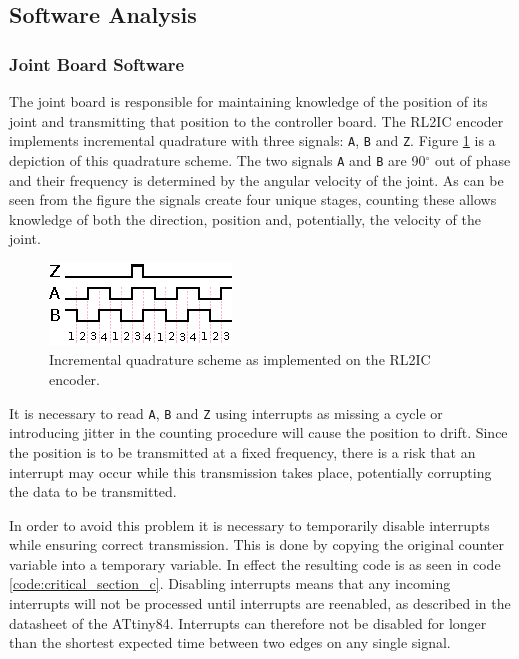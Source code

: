 \subsection{Software Analysis} %
\label{sub:software_analysis}

\subsubsection{Joint Board Software} %
\label{ssub:joint_board_software}
The joint board is responsible for maintaining knowledge of the position of its joint and transmitting that position to the controller board.
The RL2IC encoder implements incremental quadrature with three signals: \texttt{A}, \texttt{B} and \texttt{Z}.
Figure \ref{fig:quadrature} is a depiction of this quadrature scheme.
The two signals \texttt{A} and \texttt{B} are 90$^\circ$ out of phase and their frequency is determined by the angular velocity of the joint.
As can be seen from the figure the signals create four unique stages, counting these allows knowledge of both the direction, position and, potentially, the velocity of the joint.

\begin{figure}[h]
	\centering
	\includegraphics[width=.5\linewidth]{graphics/quadrature}
	\caption{Incremental quadrature scheme as implemented on the RL2IC encoder.}
	\label{fig:quadrature}
\end{figure}

It is necessary to read \texttt{A}, \texttt{B} and \texttt{Z} using interrupts as missing a cycle or introducing jitter in the counting procedure will cause the position to drift.
Since the position is to be transmitted at a fixed frequency, there is a risk that an interrupt may occur while this transmission takes place, potentially corrupting the data to be transmitted.

In order to avoid this problem it is necessary to temporarily disable interrupts while ensuring correct transmission.
This is done by copying the original counter variable into a temporary variable. 
In effect the resulting code is as seen in code \ref{code:critical_section_c}.
Disabling interrupts means that any incoming interrupts will not be processed until interrupts are reenabled, as described in the datasheet of the ATtiny84.
Interrupts can therefore not be disabled for longer than the shortest expected time between two edges on any single signal.

